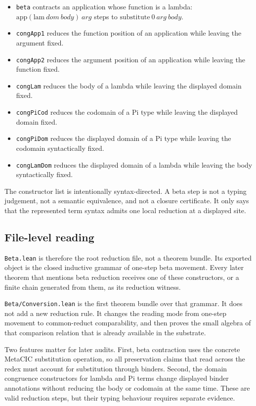 \begin{itemize}
\item \texttt{beta} contracts an application whose function is a lambda:
  $\mathrm{app}(\mathrm{lam}\ dom\ body)\ arg$ steps to
  $\mathrm{substitute}\ 0\ arg\ body$.
\item \texttt{congApp1} reduces the function position of an application while
  leaving the argument fixed.
\item \texttt{congApp2} reduces the argument position of an application while
  leaving the function fixed.
\item \texttt{congLam} reduces the body of a lambda while leaving the displayed
  domain fixed.
\item \texttt{congPiCod} reduces the codomain of a Pi type while leaving the
  displayed domain fixed.
\item \texttt{congPiDom} reduces the displayed domain of a Pi type while
  leaving the codomain syntactically fixed.
\item \texttt{congLamDom} reduces the displayed domain of a lambda while
  leaving the body syntactically fixed.
\end{itemize}

The constructor list is intentionally syntax-directed. A beta step is not a
typing judgement, not a semantic equivalence, and not a closure certificate. It
only says that the represented term syntax admits one local reduction at a
displayed site.

\subsection{File-level reading}
\label{subsec:metacic-beta-audit-map-file-reading}

\texttt{Beta.lean} is therefore the root reduction file, not a theorem bundle.
Its exported object is the closed inductive grammar of one-step beta movement.
Every later theorem that mentions beta reduction receives one of these
constructors, or a finite chain generated from them, as its reduction witness.

\texttt{Beta/Conversion.lean} is the first theorem bundle over that grammar. It
does not add a new reduction rule. It changes the reading mode from one-step
movement to common-reduct comparability, and then proves the small algebra of
that comparison relation that is already available in the substrate.

Two features matter for later audits. First, beta contraction uses the concrete
MetaCIC substitution operation, so all preservation claims that read across the
redex must account for substitution through binders. Second, the domain
congruence constructors for lambda and Pi terms change displayed binder
annotations without reducing the body or codomain at the same time. These are
valid reduction steps, but their typing behaviour requires separate evidence.

